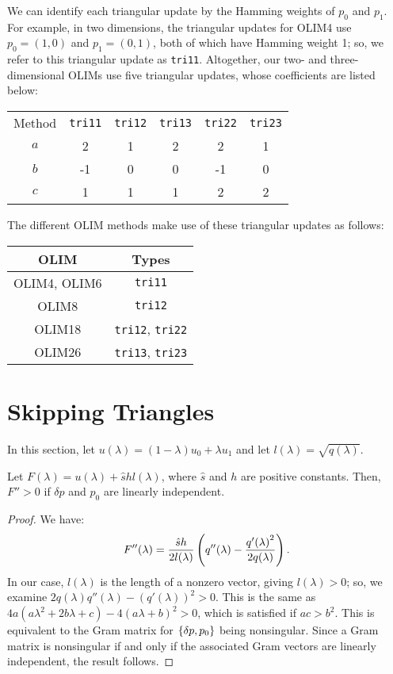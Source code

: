 \documentclass{article}
\begin{document}
We can identify each triangular update by the Hamming weights of $p_0$
and $p_1$. For example, in two dimensions, the triangular updates for
OLIM4 use $p_0 = (1, 0)$ and $p_1 = (0, 1)$, both of which have
Hamming weight 1; so, we refer to this triangular update as
\texttt{tri11}. Altogether, our two- and three-dimensional OLIMs use
five triangular updates, whose coefficients are listed below:
\begin{center}
  \begin{tabular}{c|ccccc}
    Method & \texttt{tri11} & \texttt{tri12} & \texttt{tri13} & \texttt{tri22} & \texttt{tri23} \\
    $a$ & 2 & 1 & 2 & 2 & 1 \\
    $b$ & -1 & 0 & 0 & -1 & 0 \\
    $c$ & 1 & 1 & 1 & 2 & 2
  \end{tabular}
\end{center}
The different OLIM methods make use of these triangular updates as
follows:
\begin{center}
  \begin{tabular}[h]{cc}
    OLIM & Types \\
    \midrule
    OLIM4, OLIM6 & \texttt{tri11} \\
    OLIM8 & \texttt{tri12} \\
    OLIM18 & \texttt{tri12}, \texttt{tri22} \\
    OLIM26 & \texttt{tri13}, \texttt{tri23}
  \end{tabular}
\end{center}

\section{Skipping Triangles}

In this section, let $u(\lambda) = (1 - \lambda) u_0 + \lambda u_1$
and let $l(\lambda) = \sqrt{q(\lambda)}$.

\begin{lemma}\label{lemma:positive-second-derivative-of-F}
  Let $F(\lambda) = u(\lambda) + \hat{s} h l(\lambda)$, where
  $\hat{s}$ and $h$ are positive constants. Then, $F'' > 0$ if
  $\delta p$ and $p_0$ are linearly independent.
\end{lemma}

\begin{proof}
  We have:
  \begin{align*}
    F''(\lambda) = \frac{\hat{s}h}{2 l(\lambda)} \left(q''(\lambda) - \frac{{q'(\lambda)}^2}{2q(\lambda)}\right).
  \end{align*}
  In our case, $l(\lambda)$ is the length of a nonzero vector, giving
  $l(\lambda) > 0$; so, we examine
  $2q(\lambda)q''(\lambda) - {(q'(\lambda))}^2 > 0$. This is the same
  as $4a(a\lambda^2 + 2b\lambda + c) - 4(a\lambda + b)^2 > 0$, which
  is satisfied if $ac > b^2$. This is equivalent to the Gram matrix
  for $\left\{\delta p, p_0\right\}$ being nonsingular. Since a Gram matrix is
  nonsingular if and only if the associated Gram vectors are linearly
  independent, the result follows.
\end{proof}
\end{document}
